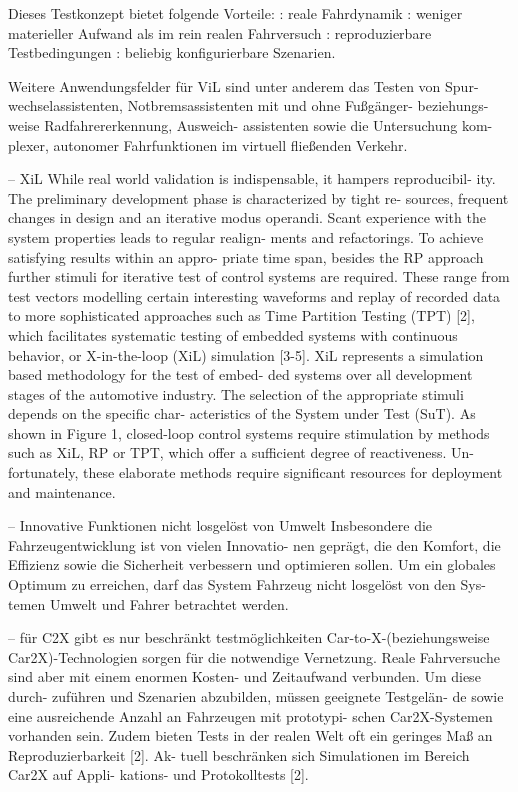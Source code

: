 Dieses Testkonzept bietet folgende Vorteile:
: reale Fahrdynamik
: weniger materieller Aufwand als im rein realen Fahrversuch
: reproduzierbare Testbedingungen
: beliebig konfigurierbare Szenarien. 

Weitere Anwendungsfelder für ViL sind unter anderem das Testen von Spur- wechselassistenten, Notbremsassistenten mit und ohne Fußgänger- beziehungs- weise Radfahrererkennung, Ausweich- assistenten sowie die Untersuchung kom- plexer, autonomer Fahrfunktionen im virtuell fließenden Verkehr. \cite{schwab2014durchgangige}





-- XiL
While real world validation is indispensable, it hampers reproducibil- ity. The preliminary development phase is characterized by tight re- sources, frequent changes in design and an iterative modus operandi. Scant experience with the system properties leads to regular realign- ments and refactorings. To achieve satisfying results within an appro- priate time span, besides the RP approach further stimuli for iterative test of control systems are required. These range from test vectors modelling certain interesting waveforms and replay of recorded data to more sophisticated approaches such as Time Partition Testing (TPT) [2], which facilitates systematic testing of embedded systems with continuous behavior, or X-in-the-loop (XiL) simulation [3-5]. XiL represents a simulation based methodology for the test of embed- ded systems over all development stages of the automotive industry. The selection of the appropriate stimuli depends on the specific char- acteristics of the System under Test (SuT). As shown in Figure 1, closed-loop control systems require stimulation by methods such as XiL, RP or TPT, which offer a sufficient degree of reactiveness. Un- fortunately, these elaborate methods require significant resources for deployment and maintenance. \cite{bach2017reactive}



-- Innovative Funktionen nicht losgelöst von Umwelt
Insbesondere die Fahrzeugentwicklung ist von vielen Innovatio- nen geprägt, die den Komfort, die Effizienz sowie die Sicherheit verbessern und optimieren sollen. Um ein globales Optimum zu erreichen, darf das System Fahrzeug nicht losgelöst von den Sys- temen Umwelt und Fahrer betrachtet werden. \cite{albers2010x}

-- für C2X gibt es nur beschränkt testmöglichkeiten
Car-to-X-(beziehungsweise Car2X)-Technologien sorgen für die notwendige Vernetzung. Reale Fahrversuche sind aber mit einem enormen Kosten- und Zeitaufwand verbunden. Um diese durch- zuführen und Szenarien abzubilden, müssen geeignete Testgelän- de sowie eine ausreichende Anzahl an Fahrzeugen mit prototypi- schen Car2X-Systemen vorhanden sein. Zudem bieten Tests in der realen Welt oft ein geringes Maß an Reproduzierbarkeit [2]. Ak- tuell beschränken sich Simulationen im Bereich Car2X auf Appli- kations- und Protokolltests [2].\cite{albers2010x}


